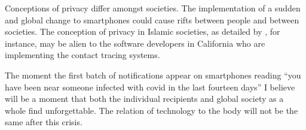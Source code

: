 \documentclass[russian,american]{../../../coursework}
\begin{document}
Conceptions of privacy differ amongst societies. The implementation of a
sudden and global change to smartphones could cause rifts between people and
between societies. The conception of privacy in Islamic societies, as detailed
by \textcite{Abokhodair2016}, for instance, may be alien to the software
developers in California who are implementing the contact tracing systems.

The moment the first batch of notifications appear on smartphones reading
\enquote{you have been near someone infected with \ac{covid} in the last
fourteen days} I believe will be a moment that both the individual recipients
and global society as a whole find unforgettable. The relation of technology to the
body will not be the same after this crisis.

\clearpage\printbibliography
\end{document}

